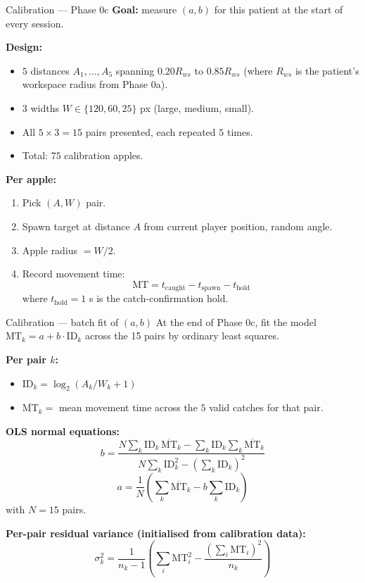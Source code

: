 \documentclass[10pt,aspectratio=169]{beamer}
\begin{document}
\begin{frame}{Calibration --- Phase 0c}
\textbf{Goal:} measure $(a, b)$ for this patient at the start of every session.

\textbf{Design:}
\begin{itemize}
    \item $5$ distances $A_1, \ldots, A_5$ spanning $0.20 R_{ws}$ to $0.85 R_{ws}$ (where $R_{ws}$ is the patient's workspace radius from Phase 0a).
    \item $3$ widths $W \in \{120, 60, 25\}$ px (large, medium, small).
    \item All $5 \times 3 = 15$ pairs presented, each repeated $5$ times.
    \item Total: $75$ calibration apples.
\end{itemize}

\textbf{Per apple:}
\begin{enumerate}
    \item Pick $(A, W)$ pair.
    \item Spawn target at distance $A$ from current player position, random angle.
    \item Apple radius $= W / 2$.
    \item Record movement time:
    \[
    \text{MT} = t_{\text{caught}} - t_{\text{spawn}} - t_{\text{hold}}
    \]
    where $t_{\text{hold}} = 1$ s is the catch-confirmation hold.
\end{enumerate}
\end{frame}

\begin{frame}{Calibration --- batch fit of $(a, b)$}
At the end of Phase 0c, fit the model $\text{MT}_k = a + b \cdot \text{ID}_k$ across the 15 pairs by ordinary least squares.

\textbf{Per pair $k$:}
\begin{itemize}
    \item $\text{ID}_k = \log_2(A_k / W_k + 1)$
    \item $\overline{\text{MT}}_k = $ mean movement time across the $5$ valid catches for that pair.
\end{itemize}

\textbf{OLS normal equations:}
\[
b = \frac{N \sum_k \text{ID}_k \, \overline{\text{MT}}_k - \sum_k \text{ID}_k \sum_k \overline{\text{MT}}_k}{N \sum_k \text{ID}_k^2 - (\sum_k \text{ID}_k)^2}
\]
\[
a = \frac{1}{N}\!\left( \sum_k \overline{\text{MT}}_k - b \sum_k \text{ID}_k \right)
\]
with $N = 15$ pairs.

\textbf{Per-pair residual variance (initialised from calibration data):}
\[
\sigma_k^2 = \frac{1}{n_k - 1}\!\left( \sum_i \text{MT}_i^2 - \frac{(\sum_i \text{MT}_i)^2}{n_k} \right)
\]
\end{frame}
\end{document}
